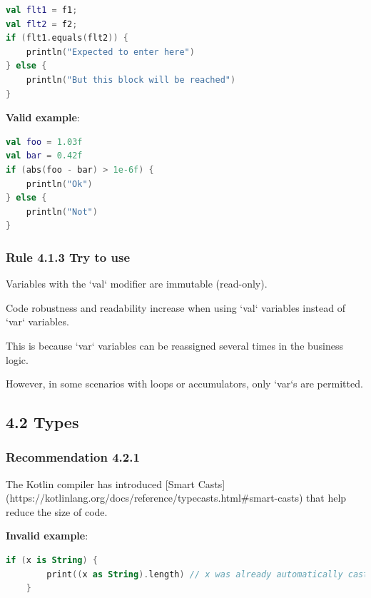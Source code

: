 {{{{\begin{lstlisting}[language=Kotlin]
val flt1 = f1;
val flt2 = f2;
if (flt1.equals(flt2)) {
    println("Expected to enter here")
} else {
    println("But this block will be reached")
}
\end{lstlisting}


\textbf{Valid example}:



\begin{lstlisting}[language=Kotlin]
val foo = 1.03f
val bar = 0.42f
if (abs(foo - bar) > 1e-6f) {
    println("Ok")
} else {
    println("Not")
}
\end{lstlisting}


\subsubsection*{\textbf{Rule 4.1.3 Try to use}}
\leavevmode\newline



Variables with the `val` modifier are immutable (read-only).

Code robustness and readability increase when using `val` variables instead of `var` variables.

This is because `var` variables can be reassigned several times in the business logic.

However, in some scenarios with loops or accumulators, only `var`s are permitted.



\subsection*{\textbf{4.2 Types}}

\subsubsection*{\textbf{Recommendation 4.2.1}}
\leavevmode\newline



The Kotlin compiler has introduced [Smart Casts](https://kotlinlang.org/docs/reference/typecasts.html\#smart-casts) that help reduce the size of code.



\textbf{Invalid example}:

\begin{lstlisting}[language=Kotlin]
    if (x is String) {
        print((x as String).length) // x was already automatically cast to String - no need to use 'as' keyword here
    }
\end{lstlisting}


}}}}
